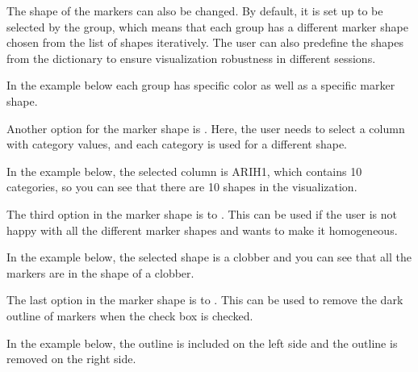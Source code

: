 \documentclass[letterpaper,10pt,english,openany,oneside]{sphinxmanual}
\begin{document}
\sphinxAtStartPar
The shape of the markers can also be changed. By default, it is set up to be selected by the group, which means that each group has a different marker shape chosen from the list of shapes iteratively. The user can also pre\sphinxhyphen{}define the shapes from the dictionary to ensure visualization robustness in different sessions.

\sphinxAtStartPar
{}

\sphinxAtStartPar
In the example below each group has specific color as well as a specific marker shape.

\sphinxAtStartPar
{}

\sphinxAtStartPar
Another option for the marker shape is . Here, the user needs to select a column with category values, and each category is used for a different shape.

\sphinxAtStartPar
{}

\sphinxAtStartPar
In the example below, the selected column is ARIH1, which contains 10 categories, so you can see that there are 10 shapes in the visualization.

\sphinxAtStartPar
{}

\sphinxAtStartPar
The third option in the marker shape is to . This can be used if the user is not happy with all the different marker shapes and wants to make it homogeneous.

\sphinxAtStartPar
{}

\sphinxAtStartPar
In the example below, the selected shape is a clobber and you can see that all the markers are in the shape of a clobber.

\sphinxAtStartPar
{}

\sphinxAtStartPar
The last option in the marker shape is to . This can be used to remove the dark outline of markers when the check box is checked.

\sphinxAtStartPar
{}

\sphinxAtStartPar
In the example below, the outline is included on the left side and the outline is removed on the right side.

\sphinxAtStartPar
{}
\end{document}
